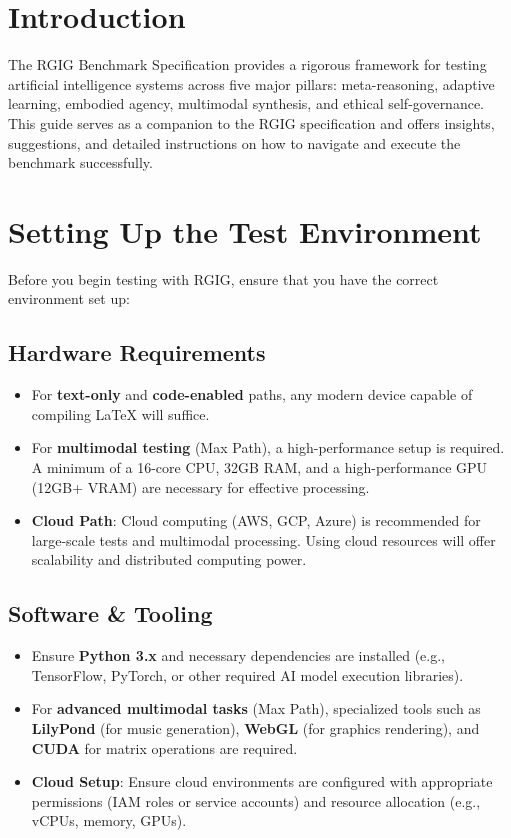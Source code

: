 
\section*{Introduction}
The RGIG Benchmark Specification provides a rigorous framework for testing artificial intelligence systems across five major pillars: meta-reasoning, adaptive learning, embodied agency, multimodal synthesis, and ethical self-governance. This guide serves as a companion to the RGIG specification and offers insights, suggestions, and detailed instructions on how to navigate and execute the benchmark successfully.

\section*{Setting Up the Test Environment}
Before you begin testing with RGIG, ensure that you have the correct environment set up:

\subsection*{Hardware Requirements}
\begin{itemize}
  \item For \textbf{text-only} and \textbf{code-enabled} paths, any modern device capable of compiling \LaTeX{} will suffice.
  \item For \textbf{multimodal testing} (Max Path), a high-performance setup is required. A minimum of a 16-core CPU, 32GB RAM, and a high-performance GPU (12GB+ VRAM) are necessary for effective processing.
  \item \textbf{Cloud Path}: Cloud computing (AWS, GCP, Azure) is recommended for large-scale tests and multimodal processing. Using cloud resources will offer scalability and distributed computing power.
\end{itemize}

\subsection*{Software \& Tooling}
\begin{itemize}
  \item Ensure \textbf{Python 3.x} and necessary dependencies are installed (e.g., TensorFlow, PyTorch, or other required AI model execution libraries).
  \item For \textbf{advanced multimodal tasks} (Max Path), specialized tools such as \textbf{LilyPond} (for music generation), \textbf{WebGL} (for graphics rendering), and \textbf{CUDA} for matrix operations are required.
  \item \textbf{Cloud Setup}: Ensure cloud environments are configured with appropriate permissions (IAM roles or service accounts) and resource allocation (e.g., vCPUs, memory, GPUs).
\end{itemize}

